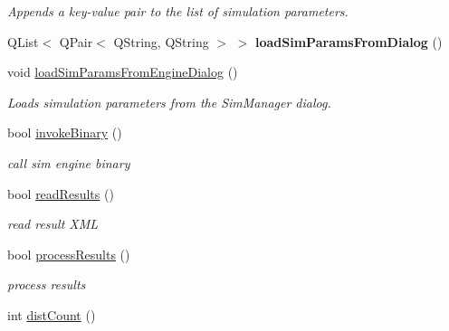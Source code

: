 \begin{DoxyCompactItemize}
\begin{DoxyCompactList}\small\item\em Appends a key-\/value pair to the list of simulation parameters. \end{DoxyCompactList}\item 
Q\+List$<$ Q\+Pair$<$ Q\+String, Q\+String $>$ $>$ {\bfseries load\+Sim\+Params\+From\+Dialog} ()\hypertarget{classprim_1_1SimJob_a3a45f44d9efb9e6a7b3b2518628d345a}{}\label{classprim_1_1SimJob_a3a45f44d9efb9e6a7b3b2518628d345a}

\item 
void \hyperlink{classprim_1_1SimJob_a9b29dd1edf375f68fed088a96e4fc621}{load\+Sim\+Params\+From\+Engine\+Dialog} ()\hypertarget{classprim_1_1SimJob_a9b29dd1edf375f68fed088a96e4fc621}{}\label{classprim_1_1SimJob_a9b29dd1edf375f68fed088a96e4fc621}

\begin{DoxyCompactList}\small\item\em Loads simulation parameters from the Sim\+Manager dialog. \end{DoxyCompactList}\item 
bool \hyperlink{classprim_1_1SimJob_a8f8c1cde6f56e3408b67299a32447e9a}{invoke\+Binary} ()\hypertarget{classprim_1_1SimJob_a8f8c1cde6f56e3408b67299a32447e9a}{}\label{classprim_1_1SimJob_a8f8c1cde6f56e3408b67299a32447e9a}

\begin{DoxyCompactList}\small\item\em call sim engine binary \end{DoxyCompactList}\item 
bool \hyperlink{classprim_1_1SimJob_a39a7b2020dd4650d690ad26e66b3ac6d}{read\+Results} ()\hypertarget{classprim_1_1SimJob_a39a7b2020dd4650d690ad26e66b3ac6d}{}\label{classprim_1_1SimJob_a39a7b2020dd4650d690ad26e66b3ac6d}

\begin{DoxyCompactList}\small\item\em read result X\+ML \end{DoxyCompactList}\item 
bool \hyperlink{classprim_1_1SimJob_a80823acf6fe3edde715f195684422817}{process\+Results} ()\hypertarget{classprim_1_1SimJob_a80823acf6fe3edde715f195684422817}{}\label{classprim_1_1SimJob_a80823acf6fe3edde715f195684422817}

\begin{DoxyCompactList}\small\item\em process results \end{DoxyCompactList}\item 
int \hyperlink{classprim_1_1SimJob_aaa3402ea923262561db3d5f4eba43f08}{dist\+Count} ()\hypertarget{classprim_1_1SimJob_aaa3402ea923262561db3d5f4eba43f08}{}\label{classprim_1_1SimJob_aaa3402ea923262561db3d5f4eba43f08}


\end{DoxyCompactItemize}
